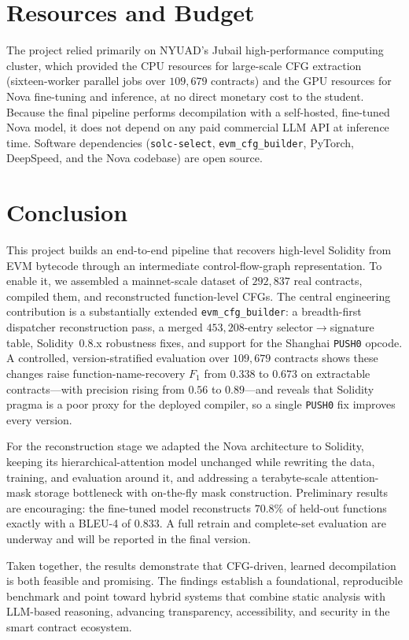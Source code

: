 \documentclass{stylefiles/capstone}
\begin{document}
\section{Resources and Budget}

The project relied primarily on NYUAD's Jubail high-performance computing cluster,
which provided the CPU resources for large-scale CFG extraction (sixteen-worker
parallel jobs over $109{,}679$ contracts) and the GPU resources for Nova
fine-tuning and inference, at no direct monetary cost to the student. Because the
final pipeline performs decompilation with a self-hosted, fine-tuned Nova model, it
does not depend on any paid commercial LLM API at inference time. Software
dependencies (\texttt{solc-select}, \texttt{evm\_cfg\_builder}, PyTorch, DeepSpeed,
and the Nova codebase) are open source.

\section{Conclusion}

This project builds an end-to-end pipeline that recovers high-level Solidity from
EVM bytecode through an intermediate control-flow-graph representation. To enable
it, we assembled a mainnet-scale dataset of $292{,}837$ real contracts, compiled
them, and reconstructed function-level CFGs. The central engineering contribution
is a substantially extended \texttt{evm\_cfg\_builder}: a breadth-first dispatcher
reconstruction pass, a merged $453{,}208$-entry selector$\rightarrow$signature
table, Solidity~0.8.x robustness fixes, and support for the Shanghai
\texttt{PUSH0} opcode. A controlled, version-stratified evaluation over $109{,}679$
contracts shows these changes raise function-name-recovery $F_1$ from $0.338$ to
$0.673$ on extractable contracts—with precision rising from $0.56$ to $0.89$—and
reveals that Solidity pragma is a poor proxy for the deployed compiler, so a single
\texttt{PUSH0} fix improves every version.

For the reconstruction stage we adapted the Nova architecture to Solidity, keeping
its hierarchical-attention model unchanged while rewriting the data, training, and
evaluation around it, and addressing a terabyte-scale attention-mask storage
bottleneck with on-the-fly mask construction. Preliminary results are encouraging:
the fine-tuned model reconstructs $70.8\%$ of held-out functions exactly with a
BLEU-4 of $0.833$. A full retrain and complete-set evaluation are underway and will
be reported in the final version.

Taken together, the results demonstrate that CFG-driven, learned decompilation is
both feasible and promising. The findings establish a foundational, reproducible
benchmark and point toward hybrid systems that combine static analysis with
LLM-based reasoning, advancing transparency, accessibility, and security in the
smart contract ecosystem.


\end{document}
